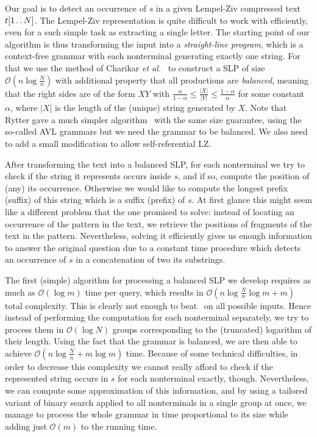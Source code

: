 \documentclass[runningheads]{llncs}
\newcommand{\twodots}{\mathinner{\ldotp\ldotp}}
\begin{document}
Our goal is to detect an occurrence of $s$ in a given Lempel-Ziv compressed text $t[1\twodots N]$. The Lempel-Ziv representation is quite difficult to work with efficiently, even for a such simple task as extracting a single letter. The starting point of our algorithm is thus transforming the input into a {\it straight-line program}, which is a context-free grammar with each nonterminal generating exactly one string. For that we use the method of Charikar {\it et al.}~\cite{CharikarApproximation} to construct a SLP of size $\mathcal{O}(n\log\frac{N}{n})$ with additional property that all productions are {\it balanced}, meaning that the right sides are of the form $XY$ with $\frac{\alpha}{1-\alpha}\leq\frac{|X|}{|Y|}\leq\frac{1-\alpha}{\alpha}$ for some constant $\alpha$, where $|X|$ is the length of the (unique) string generated by $X$. Note that Rytter gave a much simpler algorithm~\cite{RytterApproximation} with the same size guarantee, using the so-called AVL grammars but we need the grammar to be balanced. We also need to add a small modification to allow self-referential LZ.

After transforming the text into a balanced SLP, for each nonterminal we try to check if the string it represents occurs inside $s$, and if so, compute the position of (any) its occurrence. Otherwise we would like to compute the longest prefix (suffix) of this string which is a suffix (prefix) of $s$. At first glance this might seem like a different problem that the one promised to solve: instead of locating an occurrence of the pattern in the text, we retrieve the positions of fragments of the text in the pattern. Nevertheless, solving it efficiently gives us enough information to answer the original question due to a constant time procedure which detects an occurrence of $s$ in a concatenation of two its substrings. 

The first (simple) algorithm for processing a balanced SLP we develop requires as much as $\mathcal{O}(\log m)$ time per query, which results in $\mathcal{O}(n\log\frac{N}{n}\log m+m)$ total complexity. This is clearly not enough to beat~\cite{Farach} on all possible inputs. Hence instead of performing the computation for each nonterminal separately, we try to process them in $\mathcal{O}(\log N)$ groups corresponding to the (truncated) logarithm of their length. Using the fact that the grammar is balanced, we are then able to achieve $\mathcal{O}(n\log\frac{N}{n}+m\log m)$ time.  Because of some technical difficulties, in order to decrease this complexity we cannot really afford to check if the represented string occurs in $s$ for each nonterminal exactly, though. Nevertheless, we can compute some approximation of this information, and by using a tailored variant of binary search applied to all nonterminals in a single group at once, we manage to process the whole grammar in time proportional to its size while adding just $\mathcal{O}(m)$ to the running time. 
\end{document}
